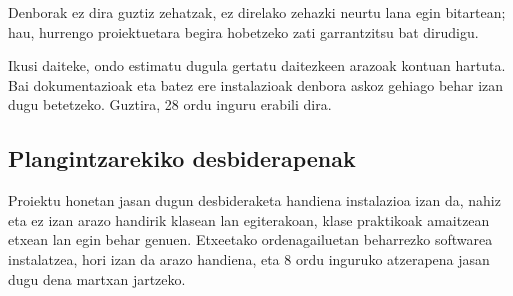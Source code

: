 \begin{important}
   Denborak ez dira guztiz zehatzak, ez direlako zehazki neurtu lana egin bitartean; hau, hurrengo proiektuetara begira hobetzeko zati garrantzitsu bat dirudigu.
\end{important}

Ikusi daiteke, ondo estimatu dugula gertatu daitezkeen arazoak kontuan hartuta. Bai dokumentazioak eta batez ere instalazioak denbora askoz gehiago behar izan dugu betetzeko. Guztira, 28 ordu inguru erabili dira.

\subsection{Plangintzarekiko desbiderapenak}

Proiektu honetan jasan dugun desbideraketa handiena instalazioa izan da, nahiz eta ez izan arazo handirik klasean lan egiterakoan, klase praktikoak amaitzean etxean lan egin behar genuen. Etxeetako ordenagailuetan beharrezko softwarea instalatzea, hori izan da arazo handiena, eta 8 ordu inguruko atzerapena jasan dugu dena martxan jartzeko.
